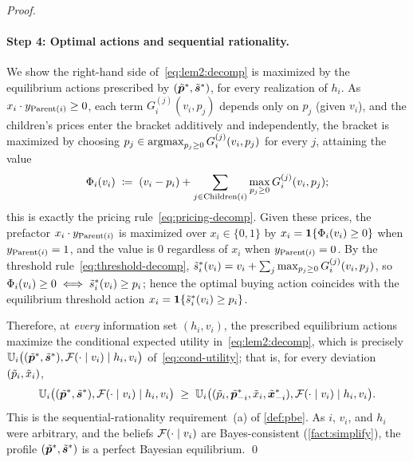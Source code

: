 \begin{proof}
\paragraph{Step 4: Optimal actions and sequential rationality.}
We show the right-hand side of~\eqref{eq:lem2:decomp} is maximized by the equilibrium actions prescribed by $(\tilde{{\bm{p}}}^*, \tilde{{\bm{s}}}^*)$, for every realization of $h_i$. As $x_i \cdot y_{\operatorname{Parent}(i)} \ge 0$, each term $G^{(j)}_i(v_i, p_j)$ depends only on $p_j$ (given $v_i$), and the children's prices enter the bracket additively and independently, the bracket is maximized by choosing $p_j \in \operatorname*{argmax}_{p_j \ge 0} G^{(j)}_i(v_i, p_j)$ for every $j$, attaining the value
\[
\Phi_i(v_i) \;\coloneqq\; (v_i - p_i) + \sum_{j \in \operatorname{Children}(i)} \max_{p_j \ge 0} G^{(j)}_i(v_i, p_j);
\]
this is exactly the pricing rule~\eqref{eq:pricing-decomp}. Given these prices, the prefactor $x_i \cdot y_{\operatorname{Parent}(i)}$ is maximized over $x_i \in \{0,1\}$ by $x_i = \bm{1}\{\Phi_i(v_i) \ge 0\}$ when $y_{\operatorname{Parent}(i)} = 1$, and the value is $0$ regardless of $x_i$ when $y_{\operatorname{Parent}(i)} = 0$. By the threshold rule~\eqref{eq:threshold-decomp}, $\tilde{s}^*_i(v_i) = v_i + \sum_{j} \max_{p_j \ge 0} G^{(j)}_i(v_i, p_j)$, so $\Phi_i(v_i) \ge 0 \iff \tilde{s}^*_i(v_i) \ge p_i$; hence the optimal buying action coincides with the equilibrium threshold action $x_i = \bm{1}\{\tilde{s}^*_i(v_i) \ge p_i\}$.

Therefore, at \emph{every} information set $(h_i, v_i)$, the prescribed equilibrium actions maximize the conditional expected utility in~\eqref{eq:lem2:decomp}, which is precisely $\mathbb{U}_i\big((\tilde{{\bm{p}}}^*, \tilde{{\bm{s}}}^*), \mathcal{F}(\cdot \mid v_i) \mid h_i, v_i\big)$ of~\eqref{eq:cond-utility}; that is, for every deviation $(\tilde{p}_i, \tilde{x}_i)$,
\[
\mathbb{U}_i\big((\tilde{{\bm{p}}}^*, \tilde{{\bm{s}}}^*), \mathcal{F}(\cdot \mid v_i) \mid h_i, v_i\big) \;\ge\; \mathbb{U}_i\big((\tilde{p}_i, \tilde{{\bm{p}}}^*_{-i}, \tilde{x}_i, \tilde{{\bm{x}}}^*_{-i}), \mathcal{F}(\cdot \mid v_i) \mid h_i, v_i\big).
\]
This is the sequential-rationality requirement~(a) of \cref{def:pbe}. As $i$, $v_i$, and $h_i$ were arbitrary, and the beliefs $\mathcal{F}(\cdot \mid v_i)$ are Bayes-consistent (\cref{fact:simplify}), the profile $(\tilde{{\bm{p}}}^*, \tilde{{\bm{s}}}^*)$ is a perfect Bayesian equilibrium.
\qed
\end{proof}
